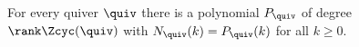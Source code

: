 \begin{theorem}[Counting]\label{sh-000C}
For every quiver $\quiv$ there is a polynomial $P_{\quiv}$ of degree $\rank \Zcyc(\quiv)$ with $N_{\quiv}(k) = P_{\quiv}(k)$ for all $k \geq 0$.
\end{theorem}
